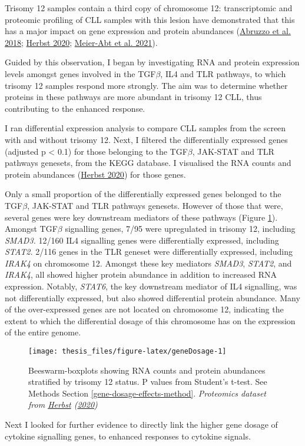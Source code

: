\documentclass[11pt, a4paper, twosided]{book}
\begin{document}
Trisomy 12 samples contain a third copy of chromosome 12: transcriptomic and proteomic profiling of CLL samples with this lesion have demonstrated that this has a major impact on gene expression and protein abundances (\protect\hyperlink{ref-Abruzzo2018}{Abruzzo et al. 2018}; \protect\hyperlink{ref-HerbstThesis}{Herbst 2020}; \protect\hyperlink{ref-MeierAbt2021}{Meier-Abt et al. 2021}).

Guided by this observation, I began by investigating RNA and protein expression levels amongst genes involved in the TGF\(\beta\), IL4 and TLR pathways, to which trisomy 12 samples respond more strongly. The aim was to determine whether proteins in these pathways are more abundant in trisomy 12 CLL, thus contributing to the enhanced response.

I ran differential expression analysis to compare CLL samples from the screen with and without trisomy 12. Next, I filtered the differentially expressed genes (adjusted p \textless{} 0.1) for those belonging to the TGF\(\beta\), JAK-STAT and TLR pathways genesets, from the KEGG database. I visualised the RNA counts and protein abundances (\protect\hyperlink{ref-HerbstThesis}{Herbst 2020}) for those genes.

Only a small proportion of the differentially expressed genes belonged to the TGF\(\beta\), JAK-STAT and TLR pathways genesets. However of those that were, several genes were key downstream mediators of these pathways (Figure \ref{fig:geneDosage}). Amongst TGF\(\beta\) signalling genes, 7/95 were upregulated in trisomy 12, including \emph{SMAD3.} 12/160 IL4 signalling genes were differentially expressed, including \emph{STAT2.} 2/116 genes in the TLR geneset were differentially expressed, including \emph{IRAK4} on chromosome 12. Amongst these key mediators \emph{SMAD3}, \emph{STAT2}, and \emph{IRAK4}, all showed higher protein abundance in addition to increased RNA expression. Notably, \emph{STAT6}, the key downstream mediator of IL4 signalling, was not differentially expressed, but also showed differential protein abundance. Many of the over-expressed genes are not located on chromosome 12, indicating the extent to which the differential dosage of this chromosome has on the expression of the entire genome.


\begin{figure}

{\centering \texttt{[image: thesis\_files/figure-latex/geneDosage-1]} 

}

\caption{Beeswarm-boxplots showing RNA counts and protein abundances stratified by trisomy 12 status. P values from Student's t-test. See Methods Section \ref{gene-dosage-effects-method}. \emph{Proteomics dataset from \protect\hyperlink{ref-HerbstThesis}{Herbst} (\protect\hyperlink{ref-HerbstThesis}{2020}) }}\label{fig:geneDosage}
\end{figure}
Next I looked for further evidence to directly link the higher gene dosage of cytokine signalling genes, to enhanced responses to cytokine signals.
\end{document}
